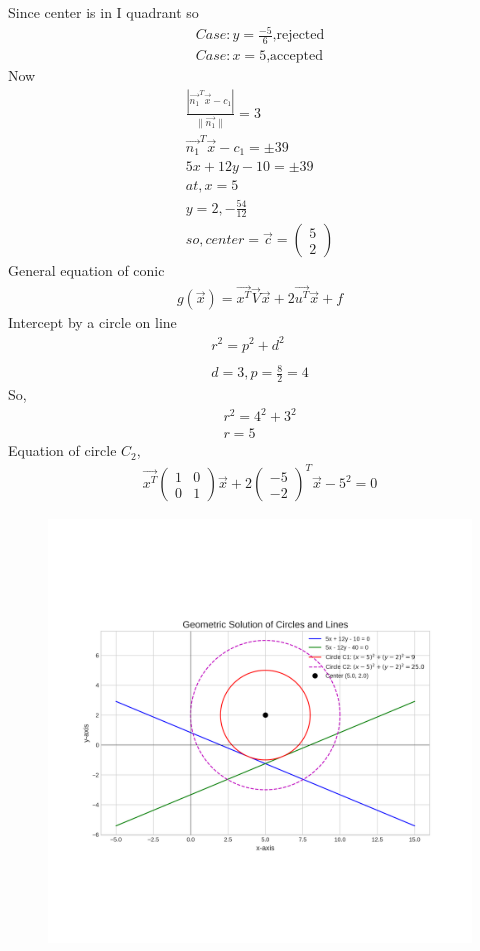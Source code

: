\documentclass[a5paper,10pt]{article}
\begin{document}
Since center is in I quadrant so
\begin{align}
    Case:y=\frac{-5}{6} \text{,rejected}\\
    Case:x=5 \text{,accepted}
\end{align}
Now
\begin{align}
    \frac{|\vec{n_1}^T\vec{x}-c_1|}{\lVert \vec{n_1}\rVert}=3\\
    \vec{n_1}^T\vec{x}-c_1=\pm 39\\
    5x+12y-10=\pm 39\\
    at,x=5\\
    y=2,-\frac{54}{12}\\
    so,center=\vec{c}=\begin{pmatrix}5\\2\end{pmatrix}
\end{align}
General equation of conic
\begin{align}
    g(\vec{x})=\vec{x^T}\vec{V}\vec{x}+2\vec{u^T}\vec{x}+f 
\end{align}
Intercept by a circle on line
\begin{align}
    r^2=p^2+d^2\\
    \\
    d=3,p=\frac{8}{2}=4
\end{align}
So,
\begin{align}
    r^2=4^2+3^2\\
    r=5
\end{align}
Equation of circle $C_2$,
\begin{align}
    \vec{x^T}\begin{pmatrix}1&0\\0&1\end{pmatrix}\vec{x}+2\begin{pmatrix}-5\\-2\end{pmatrix}^T\vec{x}-5^2=0
\end{align}

\begin{figure}[H]
    \centering
    \includegraphics[width=\columnwidth]{figs/figure.png}
    \caption{}
    \label{fig:placeholder}
\end{figure}
\end{document}
